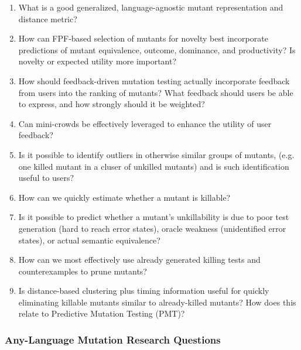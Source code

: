 \begin{enumerate}
\item What is a good generalized, language-agnostic mutant representation
  and distance metric?
\item How can FPF-based selection of mutants for novelty best incorporate
  predictions of mutant equivalence, outcome, dominance, and
  productivity?  Is novelty or expected utility more important?
\item How should feedback-driven mutation testing actually incorporate feedback from users into the
  ranking of mutants?   What feedback should users be able to express,
  and how strongly should it be weighted?
\item Can mini-crowds be effectively leveraged to enhance the utility of user feedback?
\item Is it possible to identify outliers in otherwise similar groups of
  mutants, (e.g. one killed mutant in a cluser of unkilled mutants) and is such identification useful to users?
\item How can we quickly estimate whether a
  mutant is killable?
\item Is it possible to predict whether a mutant's unkillability is due to poor test
  generation (hard to reach error states), oracle weakness
  (unidentified error states), or actual semantic equivalence?
\item How can  we most effectively use already generated killing tests
  and counterexamples to prune mutants?
\item Is distance-based clustering plus timing information useful for quickly
  eliminating killable mutants similar to already-killed mutants?  How
  does this relate to Predictive Mutation Testing (PMT)?

\end{enumerate}

\subsubsection{Any-Language Mutation Research Questions}


